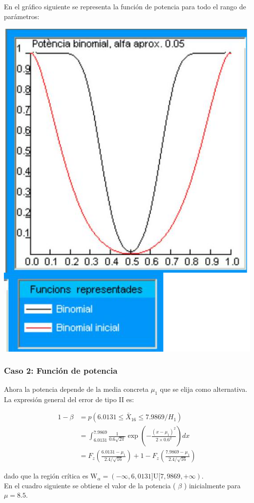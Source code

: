 \documentclass[
]{article}
\begin{document}
En el gráfico siguiente se representa la función de potencia para todo el rango de parámetros:

\begin{center}\includegraphics[width=0.6\linewidth]{images/cap9-FuncPotencia1} \end{center}

\subsubsection{Caso 2: Función de potencia}\label{caso-2-funciuxf3n-de-potencia}

Ahora la potencia depende de la media concreta \(\mu_{1}\) que se elija como alternativa. La expresión general del error de tipo II es:

\[
\begin{aligned}
1-\beta & =p\left(6.0131 \leq \bar{X}_{16} \leq 7.9869 / H_{1}\right) \\
& =\int_{6.0131}^{7.9869} \frac{1}{0.6 \sqrt{2 \pi}} \exp \left(-\frac{\left(x-\mu_{1}\right)^{2}}{2 \times 0.6^{2}}\right) d x \\
& =F_{z}\left(\frac{6.0131-\mu_{1}}{2.4 / \sqrt{16}}\right)+1-F_{z}\left(\frac{7.9869-\mu_{1}}{2.4 / \sqrt{16}}\right)
\end{aligned}
\]

dado que la región crítica es \(\mathrm{W}_{\alpha}=(-\infty, 6,0131] \mathrm{U}[7,9869,+\infty)\).\\
En el cuadro siguiente se obtiene el valor de la potencia ( \(\beta\) ) inicialmente para \(\mu=8.5\).
\end{document}
